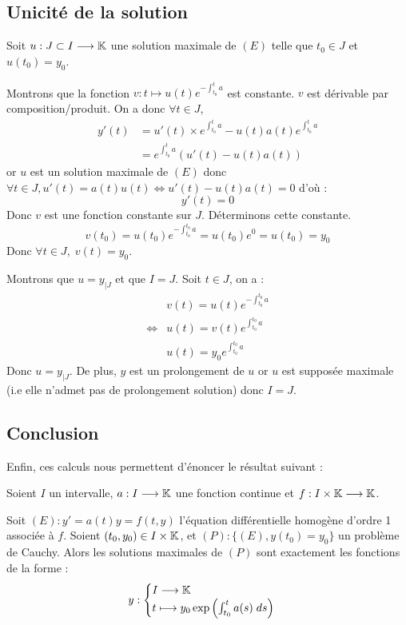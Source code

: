 \subsection{Unicité de la solution}

Soit $u : J \subset I \longrightarrow \mathbb{K}$ une solution maximale de $(E)$ telle que $t_0 \in J$ et $u(t_0) = y_0$. 

Montrons que la fonction $v : t \longmapsto u(t) e^{ - \int_{t_0}^{t} a}$ est constante. 
$v$ est dérivable par composition/produit. On a donc $ \forall t \in J$, 
    \begin{align*}
        y'(t) &= u'(t) \times e^{ \int_{t_0}^{t} a} - u(t)a(t)e^{ \int_{t_0}^{t} a} \\ 
              &= e^{ \int_{t_0}^{t} a} (u'(t) - u(t)a(t))
    \end{align*}
or $u$ est un solution maximale de $(E)$ donc $ \forall t \in J, u'(t) = a(t)u(t) \iff u'(t) - u(t)a(t) = 0$ d'où :
    \[ y'(t) = 0 \] 
Donc $v$ est une fonction constante sur $J$. Déterminons cette constante. 
    \[ v(t_0) = u(t_0) e^{ - \int_{t_0}^{t_0} a} = u(t_0)e^0 = u(t_0) = y_0 \] 
Donc $ \forall t \in J, \; v(t) = y_0 $. 

Montrons que $u = y_{ |J}$ et que $I = J$. Soit $t \in J$, on a :
    \begin{align*}
        & v(t) = u(t) e^{ - \int_{t_0}^{t_0} a} \\ 
        \iff & u(t) = v(t) e^{ \int_{t_0}^{t_0} a} \\ 
        & u(t) = y_0 e^{ \int_{t_0}^{t_0} a} 
    \end{align*}
Donc $u = y_{ |J}$. De plus, $y$ est un prolongement de $u$ or $u$ est supposée maximale (i.e elle n'admet pas de prolongement solution)
donc $I = J$. 

\subsection{Conclusion}

Enfin, ces calculs nous permettent d'énoncer le résultat suivant : 

\begin{theorem}
    Soient $I$ un intervalle, $a : I \longrightarrow \mathbb{K}$ une fonction continue et $f : I \times \mathbb{K} \longrightarrow \mathbb{K}$. 

    Soit $(E) : y' = a(t)y = f(t,y)$ l'équation différentielle homogène d'ordre 1 associée à $f$. 
    Soient $(t_0, y_0) \in I \times \mathbb{K}$, et $(P) : \{(E), y(t_0) = y_0\}$ un problème de Cauchy. 
    Alors les solutions maximales de $(P)$ sont exactement les fonctions de la forme : 
        \[ y : 
            \begin{cases}
                I \longrightarrow \mathbb{K} \\ 
                t \longmapsto y_0 \exp \left( \int_{t_0}^{t} a(s) \; ds \right)
            \end{cases}
        \] 
\end{theorem}





